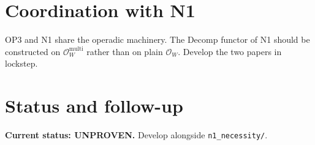 \documentclass[11pt]{article}
\theoremstyle{plain}
\theoremstyle{definition}
\begin{document}
\section{Coordination with N1}

OP3 and N1 share the operadic machinery. The Decomp functor of N1
should be constructed on $\mathcal{O}_W^{\mathrm{multi}}$ rather than
on plain $\mathcal{O}_W$. Develop the two papers in lockstep.

\section{Status and follow-up}

\textbf{Current status: UNPROVEN.} Develop alongside
\texttt{n1\_necessity/}.



\end{document}

